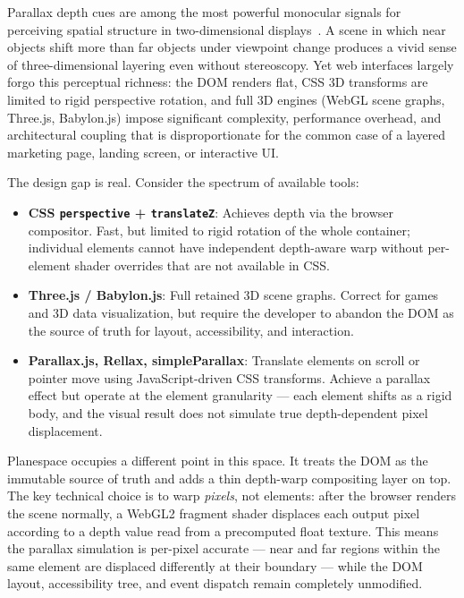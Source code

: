 \documentclass[10pt,twocolumn]{article}
\begin{document}
Parallax depth cues are among the most powerful monocular signals for
perceiving spatial structure in two-dimensional displays~\cite{cutting1995}.
A scene in which near objects shift more than far objects under viewpoint
change produces a vivid sense of three-dimensional layering even without
stereoscopy. Yet web interfaces largely forgo this perceptual richness: the
DOM renders flat, CSS 3D transforms are limited to rigid perspective rotation,
and full 3D engines (WebGL scene graphs, Three.js, Babylon.js) impose
significant complexity, performance overhead, and architectural coupling that
is disproportionate for the common case of a layered marketing page, landing
screen, or interactive UI.

The design gap is real. Consider the spectrum of available tools:

\begin{itemize}[topsep=2pt]
  \item \textbf{CSS \texttt{perspective} + \texttt{translateZ}}: Achieves
        depth via the browser compositor. Fast, but limited to rigid rotation
        of the whole container; individual elements cannot have independent
        depth-aware warp without per-element shader overrides that are not
        available in CSS.
  \item \textbf{Three.js / Babylon.js}: Full retained 3D scene graphs.
        Correct for games and 3D data visualization, but require the developer
        to abandon the DOM as the source of truth for layout, accessibility,
        and interaction.
  \item \textbf{Parallax.js, Rellax, simpleParallax}: Translate elements on
        scroll or pointer move using JavaScript-driven CSS transforms.
        Achieve a parallax effect but operate at the element granularity ---
        each element shifts as a rigid body, and the visual result does not
        simulate true depth-dependent pixel displacement.
\end{itemize}

Planespace occupies a different point in this space. It treats the DOM as
the immutable source of truth and adds a thin depth-warp compositing layer
on top. The key technical choice is to warp \emph{pixels}, not elements:
after the browser renders the scene normally, a WebGL2 fragment shader
displaces each output pixel according to a depth value read from a precomputed
float texture. This means the parallax simulation is per-pixel accurate ---
near and far regions within the same element are displaced differently at
their boundary --- while the DOM layout, accessibility tree, and event
dispatch remain completely unmodified.
\end{document}
